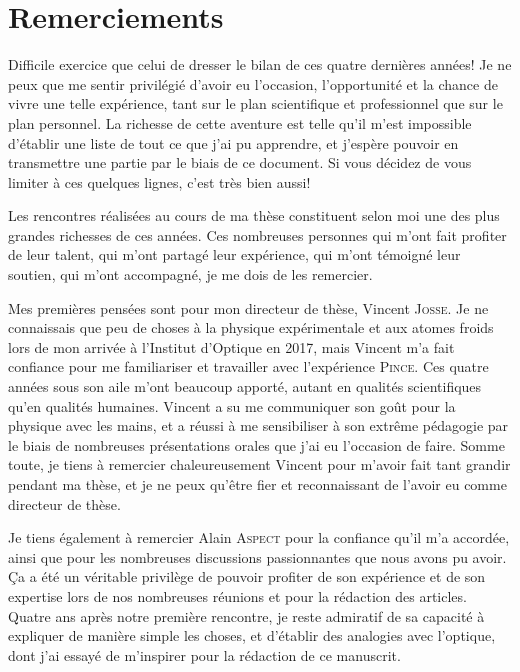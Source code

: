 \chapter*{Remerciements}

Difficile exercice que celui de dresser le bilan de ces quatre dernières années! Je ne peux que me sentir privilégié d'avoir eu l'occasion, l'opportunité et la chance de vivre une telle expérience, tant sur le plan scientifique et professionnel que sur le plan personnel. La richesse de cette aventure est telle qu'il m'est impossible d'établir une liste de tout ce que j'ai pu apprendre, et j'espère pouvoir en transmettre une partie par le biais de ce document. Si vous décidez de vous limiter à ces quelques lignes, c'est très bien aussi! 

Les rencontres réalisées au cours de ma thèse constituent selon moi une des plus grandes richesses de ces années. Ces nombreuses personnes qui m'ont fait profiter de leur talent, qui m'ont partagé leur expérience, qui m'ont témoigné leur soutien, qui m'ont accompagné, je me dois de les remercier.


Mes premières pensées sont pour mon directeur de thèse, Vincent \textsc{Josse}. Je ne connaissais que peu de choses à la physique expérimentale et aux atomes froids lors de mon arrivée à l'Institut d'Optique en 2017, mais Vincent m'a fait confiance pour me familiariser et travailler avec l'expérience \textsc{Pince}. Ces quatre années sous son aile m'ont beaucoup apporté, autant en qualités scientifiques qu'en qualités humaines. Vincent a su me communiquer son goût pour la physique avec les mains, et a réussi à me sensibiliser à son extrême pédagogie par le biais de nombreuses présentations orales que j'ai eu l'occasion de faire. Somme toute, je tiens à remercier chaleureusement Vincent pour m'avoir fait tant grandir pendant ma thèse, et je ne peux qu'être fier et reconnaissant de l'avoir eu comme directeur de thèse. 





Je tiens également à remercier Alain \textsc{Aspect} pour la confiance qu'il m'a accordée, ainsi que pour les nombreuses discussions passionnantes que nous avons pu avoir. Ça a été un véritable privilège de pouvoir profiter de son expérience et de son expertise lors de nos nombreuses réunions et pour la rédaction des articles. Quatre ans après notre première rencontre, je reste admiratif de sa capacité à expliquer de manière simple les choses, et d'établir des analogies avec l'optique, dont j'ai essayé de m'inspirer pour la rédaction de ce manuscrit. 

